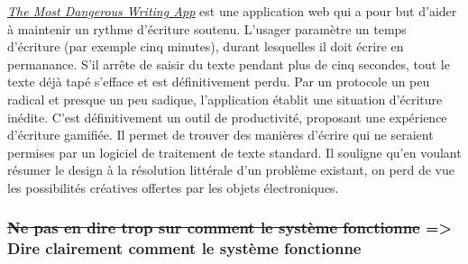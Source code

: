 \documentclass[]{article}
\begin{document}
\href{http://www.themostdangerouswritingapp.com/}{\emph{The Most
Dangerous Writing App}} est une application web qui a pour but d'aider à
maintenir un rythme d'écriture soutenu. L'usager paramètre un temps
d'écriture (par exemple cinq minutes), durant lesquelles il doit écrire
en permanance. S'il arrête de saisir du texte pendant plus de cinq
secondes, tout le texte déjà tapé s'efface et est définitivement perdu.
Par un protocole un peu radical et presque un peu sadique, l'application
établit une situation d'écriture inédite. C'est définitivement un outil
de productivité, proposant une expérience d'écriture gamifiée. Il permet
de trouver des manières d'écrire qui ne seraient permises par un
logiciel de traitement de texte standard. Il souligne qu'en voulant
résumer le design à la résolution littérale d'un problème existant, on
perd de vue les possibilités créatives offertes par les objets
électroniques.

\newpage

\hypertarget{ne-pas-en-dire-trop-sur-comment-le-systuxe8me-fonctionne-dire-clairement-comment-le-systuxe8me-fonctionne}{%
\subsubsection{\texorpdfstring{\sout{Ne pas en dire trop sur comment le
système fonctionne} =\textgreater{} Dire clairement comment le système
fonctionne}{Ne pas en dire trop sur comment le système fonctionne =\textgreater{} Dire clairement comment le système fonctionne}}\label{ne-pas-en-dire-trop-sur-comment-le-systuxe8me-fonctionne-dire-clairement-comment-le-systuxe8me-fonctionne}}
\end{document}
